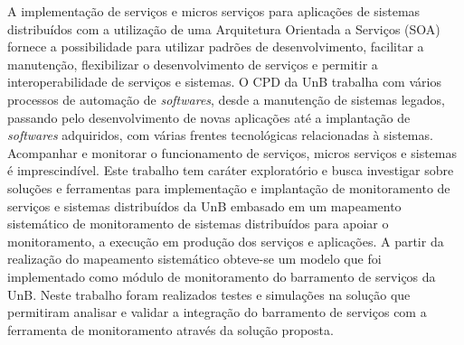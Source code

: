 A implementação de serviços e micros serviços para aplicações de sistemas distribuídos com a utilização de uma Arquitetura Orientada a Serviços (\acrshort{SOA}) fornece a possibilidade para utilizar padrões de desenvolvimento, facilitar a manutenção, flexibilizar o desenvolvimento de serviços e permitir a interoperabilidade de serviços e sistemas. O \acrfull{CPD} da \acrfull{UnB} trabalha com vários processos de automação de \textit{softwares}, desde a manutenção de sistemas legados, passando pelo desenvolvimento de novas aplicações até a implantação de \textit{softwares} adquiridos, com várias frentes tecnológicas relacionadas à sistemas. Acompanhar e monitorar o funcionamento de serviços, micros serviços e sistemas é imprescindível. Este trabalho tem caráter exploratório e busca investigar sobre soluções e ferramentas para implementação e implantação de monitoramento de serviços e sistemas distribuídos da \acrfull{UnB} embasado em um mapeamento sistemático de monitoramento de sistemas distribuídos para apoiar o monitoramento, a execução em produção dos serviços e aplicações. A partir da realização do mapeamento sistemático obteve-se um modelo que foi implementado como módulo de monitoramento do barramento de serviços da \acrfull{UnB}. Neste trabalho foram realizados testes e simulações na solução que permitiram analisar e validar a integração do barramento de serviços com a ferramenta de monitoramento através da solução proposta.